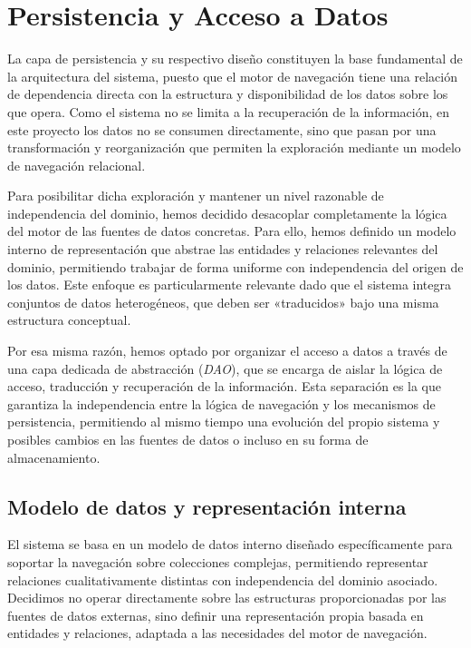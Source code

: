 \section{Persistencia y Acceso a Datos}

La capa de persistencia y su respectivo diseño constituyen la base fundamental de la arquitectura del sistema,
puesto que el motor de navegación tiene una relación de dependencia directa con la estructura y disponibilidad de los
datos sobre los que opera. Como el sistema no se limita a la recuperación de la información, en este proyecto los datos no
se consumen directamente, sino que pasan por una transformación y reorganización que permiten la exploración mediante
un modelo de navegación relacional.

Para posibilitar dicha exploración y mantener un nivel razonable de independencia del dominio, hemos decidido desacoplar
completamente la lógica del motor de las fuentes de datos concretas. Para ello, hemos definido un modelo interno de representación
que abstrae las entidades y relaciones relevantes del dominio, permitiendo trabajar de forma uniforme con independencia del origen de los
datos. Este enfoque es particularmente relevante dado que el sistema integra conjuntos de datos heterogéneos, que deben ser
«traducidos» bajo una misma estructura conceptual.

Por esa misma razón, hemos optado por organizar el acceso a datos a través de una capa dedicada de abstracción (\textit{DAO}),
que se encarga de aislar la lógica de acceso, traducción y recuperación de la información. Esta separación es la que garantiza
la independencia entre la lógica de navegación y los mecanismos de persistencia, permitiendo al mismo tiempo una evolución del propio sistema
y posibles cambios en las fuentes de datos o incluso en su forma de almacenamiento.

    \subsection*{Modelo de datos y representación interna}

El sistema se basa en un modelo de datos interno diseñado específicamente para soportar la navegación
sobre colecciones complejas, permitiendo representar relaciones cualitativamente distintas con independencia del dominio asociado.
Decidimos no operar directamente sobre las estructuras proporcionadas por las fuentes de datos externas, sino definir una representación
propia basada en entidades y relaciones, adaptada a las necesidades del motor de navegación.

